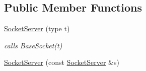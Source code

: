 \subsection*{Public Member Functions}
\begin{CompactItemize}
\item 
\hypertarget{classsocketpp_1_1SocketServer_3a6955b6d5617457cf31206ea9492786}{
\hyperlink{classsocketpp_1_1SocketServer_3a6955b6d5617457cf31206ea9492786}{SocketServer} (type t)}
\label{classsocketpp_1_1SocketServer_3a6955b6d5617457cf31206ea9492786}

\begin{CompactList}\small\item\em calls BaseSocket(t) \item\end{CompactList}\item 
\hypertarget{classsocketpp_1_1SocketServer_e83ff222d6d4dd600dc162926afdac0f}{
\hyperlink{classsocketpp_1_1SocketServer_e83ff222d6d4dd600dc162926afdac0f}{SocketServer} (const \hyperlink{classsocketpp_1_1SocketServer}{SocketServer} \&s)}
\label{classsocketpp_1_1SocketServer_e83ff222d6d4dd600dc162926afdac0f}


\end{CompactItemize}
